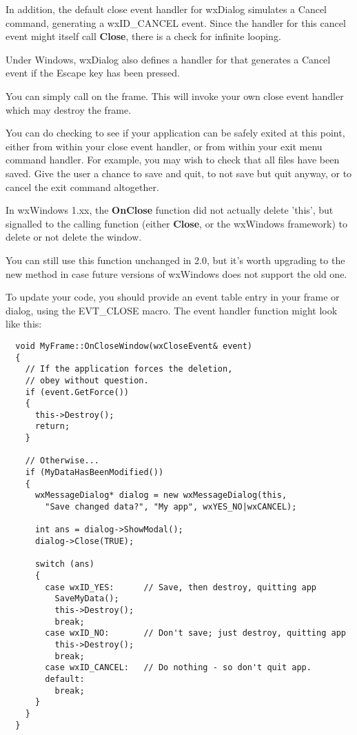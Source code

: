 In addition, the default close event handler for wxDialog simulates a Cancel command,
generating a wxID\_CANCEL event. Since the handler for this cancel event might
itself call {\bf Close}, there is a check for infinite looping.

Under Windows, wxDialog also defines a handler for  that
generates a Cancel event if the Escape key has been pressed.


You can simply call  on the frame. This
will invoke your own close event handler which may destroy the frame.

You can do checking to see if your application can be safely exited at this point,
either from within your close event handler, or from within your exit menu command
handler. For example, you may wish to check that all files have been saved.
Give the user a chance to save and quit, to not save but quit anyway, or to cancel
the exit command altogether.


In wxWindows 1.xx, the {\bf OnClose} function did not actually delete 'this', but signalled
to the calling function (either {\bf Close}, or the wxWindows framework) to delete
or not delete the window.

You can still use this function unchanged in 2.0, but it's worth upgrading to
the new method in case future versions of wxWindows does not support the old one.

To update your code, you should provide an event table entry in your frame or
dialog, using the EVT\_CLOSE macro. The event handler function might look like this:

{\small%
\begin{verbatim}
  void MyFrame::OnCloseWindow(wxCloseEvent& event)
  {
    // If the application forces the deletion,
    // obey without question.
    if (event.GetForce())
    {
      this->Destroy();
      return;
    }

    // Otherwise...
    if (MyDataHasBeenModified())
    {
      wxMessageDialog* dialog = new wxMessageDialog(this,
        "Save changed data?", "My app", wxYES_NO|wxCANCEL);

      int ans = dialog->ShowModal();
      dialog->Close(TRUE);

      switch (ans)
      {
        case wxID_YES:      // Save, then destroy, quitting app
          SaveMyData();
          this->Destroy();
          break;
        case wxID_NO:       // Don't save; just destroy, quitting app
          this->Destroy();
          break;
        case wxID_CANCEL:   // Do nothing - so don't quit app.
        default:
          break;
      }
    }
  }
\end{verbatim}
}%

